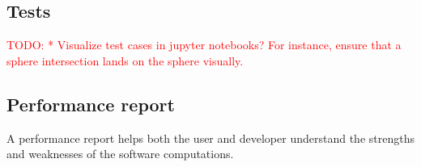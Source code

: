 \subsection{Tests}
\textcolor{red}{TODO:
* Visualize test cases in jupyter notebooks? For instance, ensure that
  a sphere intersection lands on the sphere visually.}

\subsection{Performance report}
A performance report helps both the user and developer understand the strengths
and weaknesses of the software computations.
